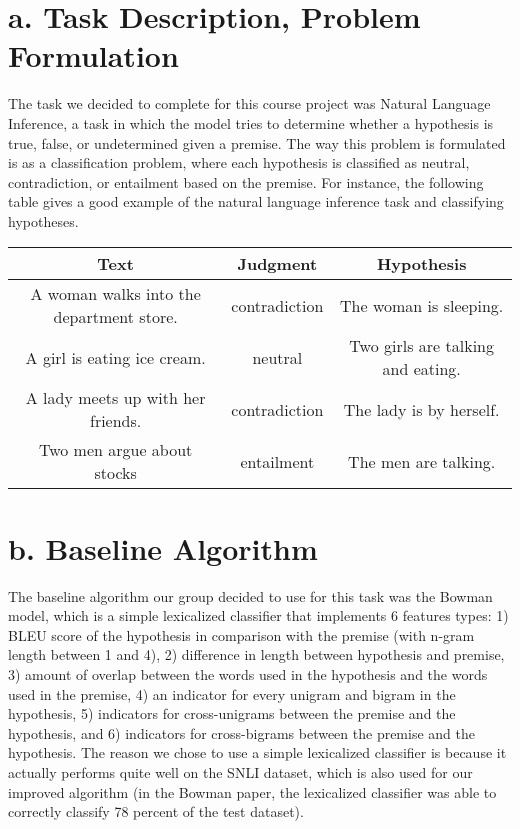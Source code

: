 \documentclass[12pt,letterpaper]{article}
\begin{document}
\section*{a. Task Description, Problem Formulation}
The task we decided to complete for this course project was Natural Language Inference, a task in which the model tries to determine whether a hypothesis is true, false, or undetermined given a premise. The way this problem is formulated is as a classification problem, where each hypothesis is classified as neutral, contradiction, or entailment based on the premise. For instance, the following table gives a good example of the natural language inference task and classifying hypotheses.
\begin{center}
    \begin{tabular}{| c | c | c |}
        \hline
        Text & Judgment & Hypothesis \\ \hline
        A woman walks into the department store. & contradiction & The woman is sleeping.
        \\ \hline
        A girl is eating ice cream. & neutral & Two girls are talking and eating. \\ \hline
        A lady meets up with her friends. & contradiction & The lady is by herself. \\ \hline
        Two men argue about stocks & entailment & The men are talking. \\ \hline
    \end{tabular}
\end{center}
\section*{b. Baseline Algorithm}
The baseline algorithm our group decided to use for this task was the Bowman model, which is a simple lexicalized classifier that implements 6 features types: 1) BLEU score of the hypothesis in comparison with the premise (with n-gram length between 1 and 4), 2) difference in length between hypothesis and premise, 3) amount of overlap between the words used in the hypothesis and the words used in the premise, 4) an indicator for every unigram and bigram in the hypothesis, 5) indicators for cross-unigrams between the premise and the hypothesis, and 6) indicators for cross-bigrams between the premise and the hypothesis. The reason we chose to use a simple lexicalized classifier is because it actually performs quite well on the SNLI dataset, which is also used for our improved algorithm (in the Bowman paper, the lexicalized classifier was able to correctly classify 78 percent of the test dataset). 
\end{document}
